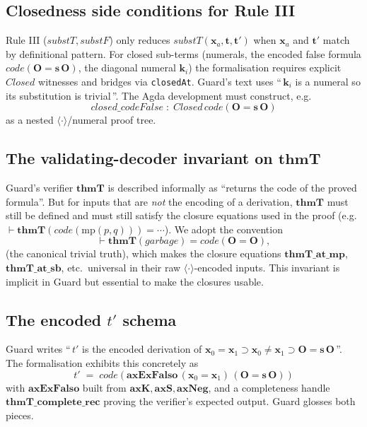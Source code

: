 \documentclass[11pt]{article}
\theoremstyle{plain}
\theoremstyle{definition}
\theoremstyle{remark}
\newcommand{\code}[1]{\mathit{code}(#1)}
\newcommand{\thmT}{\mathbf{thmT}}
\newcommand{\seq}[1]{\langle #1 \rangle}
\newcommand{\Closed}{\mathit{Closed}}
\newcommand{\substT}{\mathit{substT}}
\newcommand{\substF}{\mathit{substF}}
\begin{document}
\subsection{Closedness side conditions for Rule III}

Rule III ($\substT, \substF$) only reduces $\substT(\mathbf{x}_a,
\mathbf{t}, \mathbf{t}')$ when $\mathbf{x}_a$ and $\mathbf{t}'$ match
by definitional pattern.  For closed sub-terms (numerals, the encoded
false formula $\code{\mathbf{O} = \mathbf{s}\,\mathbf{O}}$, the
diagonal numeral $\mathbf{k}_i$) the formalisation requires explicit
$\Closed$ witnesses and bridges via \texttt{closedAt}.  Guard's text
uses ``\,$\mathbf{k}_i$ is a numeral so its substitution is
trivial\,''.  The Agda development must construct, e.g.\
\[
\mathit{closed\_codeFalse} \;:\; \Closed\,\code{\mathbf{O} = \mathbf{s}\,\mathbf{O}}
\]
as a nested $\seq{\cdot}$/numeral proof tree.

\subsection{The validating-decoder invariant on $\thmT$}

Guard's verifier $\thmT$ is described informally as ``returns the code
of the proved formula''.  But for inputs that are \emph{not} the
encoding of a derivation, $\thmT$ must still be defined and must still
satisfy the closure equations used in the proof (e.g.\
$\vdash \thmT(\code{\mathrm{mp}(p,q)}) = \cdots$).  We adopt the
convention
\[
\vdash \thmT(\mathit{garbage}) = \code{\mathbf{O} = \mathbf{O}},
\]
(the canonical trivial truth), which makes the closure equations
$\mathbf{thmT\_at\_mp}$, $\mathbf{thmT\_at\_sb}$, etc.\ universal in
their raw $\seq{\cdot}$-encoded inputs.  This invariant is implicit in Guard
but essential to make the closures usable.

\subsection{The encoded $t'$ schema}

Guard writes ``\,$t'$ is the encoded derivation of $\mathbf{x}_0 =
\mathbf{x}_1 \supset \mathbf{x}_0 \neq \mathbf{x}_1 \supset \mathbf{O}
= \mathbf{s}\,\mathbf{O}$\,''.  The formalisation exhibits this
concretely as
\[
t' \;=\; \code{\mathbf{axExFalso}\,(\mathbf{x}_0 = \mathbf{x}_1)\,(\mathbf{O} = \mathbf{s}\,\mathbf{O})}
\]
with $\mathbf{axExFalso}$ built from $\mathbf{axK}, \mathbf{axS},
\mathbf{axNeg}$, and a completeness handle
$\mathbf{thmT\_complete\_rec}$ proving the verifier's expected output.
Guard glosses both pieces.
\end{document}
